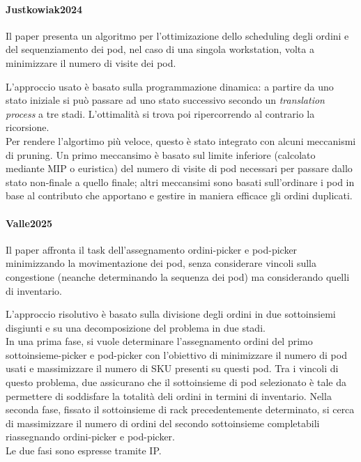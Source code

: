 \documentclass{article}
\begin{document}
\paragraph{Justkowiak2024 \cite{Justkowiak2024}}
Il paper presenta un algoritmo per l'ottimizazione dello scheduling degli ordini e del sequenziamento dei pod, nel caso di una singola workstation, volta a minimizzare il numero di visite dei pod. 

L'approccio usato è basato sulla programmazione dinamica: a partire da uno stato iniziale si può passare ad uno stato successivo secondo un \emph{translation process} a tre stadi. L'ottimalità si trova poi ripercorrendo al contrario la ricorsione. \\
Per rendere l'algortimo più veloce, questo è stato integrato con alcuni meccanismi di pruning. Un primo meccansimo è basato sul limite inferiore (calcolato mediante MIP o euristica) del numero di visite di pod necessari per passare dallo stato non-finale a quello finale; altri meccansimi sono basati sull'ordinare i pod in base al contributo che apportano e gestire in maniera efficace gli ordini duplicati.



\paragraph{Valle2025 \cite{Valle2025}}
Il paper affronta il task dell'assegnamento ordini-picker e pod-picker minimizzando la movimentazione dei pod, senza considerare vincoli sulla congestione (neanche determinando la sequenza dei pod) ma considerando quelli di inventario.

L'approccio risolutivo è basato sulla divisione degli ordini in due sottoinsiemi disgiunti e su una decomposizione del problema in due stadi. \\
In una prima fase, si vuole determinare l'assegnamento ordini del primo sottoinsieme-picker e pod-picker con l'obiettivo di minimizzare il numero di pod usati e massimizzare il numero di SKU presenti su questi pod. Tra i vincoli di questo problema, due assicurano che il sottoinsieme di pod selezionato è tale da permettere di soddisfare la totalità deli ordini in termini di inventario. 
Nella seconda fase, fissato il sottoinsieme di rack precedentemente determinato, si cerca di massimizzare il numero di ordini del secondo sottoinsieme completabili riassegnando ordini-picker e pod-picker. \\
Le due fasi sono espresse tramite IP.
\end{document}
